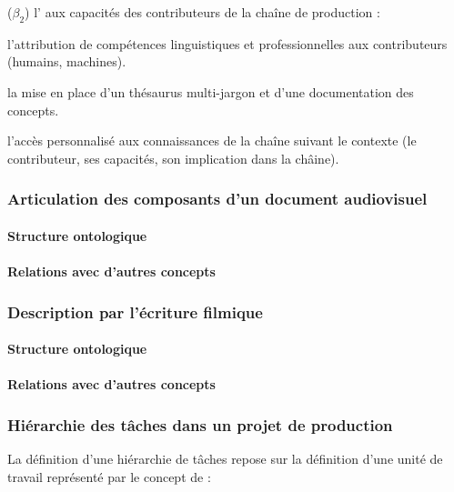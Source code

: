 \begin{listeni}
	\item[($\beta_2$)] l' aux capacités des contributeurs de la chaîne de production : 
	\begin{liste}
		\item l'attribution de compétences linguistiques et professionnelles aux contributeurs (humains, machines).
		\item la mise en place d'un thésaurus multi-jargon et d'une documentation des concepts.
		\item l'accès personnalisé aux connaissances de la chaîne suivant le contexte (le contributeur, ses capacités, son implication dans la châine).
	\end{liste}

\end{listeni}



\subsubsection{Articulation des composants d'un document audiovisuel}
\paragraph{Structure ontologique}
\paragraph{Relations avec d'autres concepts}

\subsubsection{Description par l'écriture filmique}
\paragraph{Structure ontologique}
\paragraph{Relations avec d'autres concepts}

\subsubsection{Hiérarchie des tâches dans un projet de production}
La définition d'une hiérarchie de tâches repose sur la définition d'une unité de travail représenté par le concept de  : 

